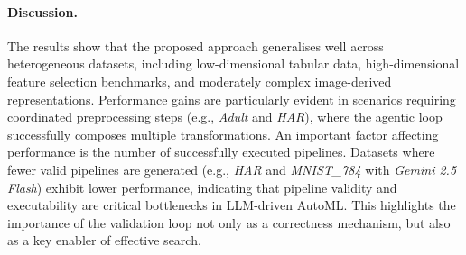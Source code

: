 \documentclass[runningheads]{llncs}
\begin{document}


\paragraph{Discussion.}

The results show that the proposed approach generalises well across heterogeneous datasets,
including low-dimensional tabular data,
high-dimensional feature selection benchmarks,
and moderately complex image-derived representations.
%
Performance gains are particularly evident in scenarios requiring coordinated preprocessing steps
(e.g., \textit{Adult} and \textit{HAR}),
where the agentic loop successfully composes multiple transformations.
%
% 
An important factor affecting performance is the number of successfully executed pipelines.
%
Datasets where fewer valid pipelines are generated
(e.g., \textit{HAR} and \textit{MNIST\_784} with \textit{Gemini 2.5 Flash})
exhibit lower performance,
indicating that pipeline validity and executability are critical bottlenecks in LLM-driven \ac{AutoML}.
%
This highlights the importance of the validation loop not only as a correctness mechanism,
but also as a key enabler of effective search.

\end{document}
